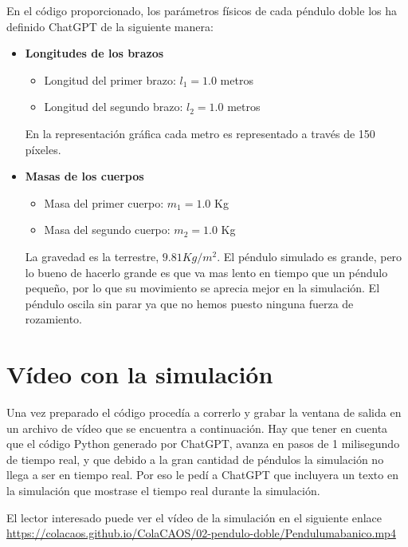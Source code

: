 \documentclass[
  10pt,
  a4paper,
  DIV=11,
  numbers=noendperiod,
  open=any]{scrreprt}
\providecommand{\tightlist}{%
  \setlength{\itemsep}{0pt}\setlength{\parskip}{0pt}}
\numberwithin{equation}{chapter}
\numberwithin{equation}{section}
\renewcommand{\[}{\begin{equation}}
\renewcommand{\]}{\end{equation}}
\begin{document}
En el código proporcionado, los parámetros físicos de cada péndulo doble
los ha definido ChatGPT de la siguiente manera:

\begin{itemize}
\item
  \textbf{Longitudes de los brazos}

  \begin{itemize}
  \tightlist
  \item
    Longitud del primer brazo: \(l_1 = 1.0\) metros\\
  \item
    Longitud del segundo brazo: \(l_2 = 1.0\) metros
  \end{itemize}

  En la representación gráfica cada metro es representado a través de
  150 píxeles.
\item
  \textbf{Masas de los cuerpos}

  \begin{itemize}
  \tightlist
  \item
    Masa del primer cuerpo: \(m_1 = 1.0\) Kg
  \item
    Masa del segundo cuerpo: \(m_2 = 1.0\) Kg
  \end{itemize}

  La gravedad es la terrestre, \(9.81 Kg/m^2\). El péndulo simulado es
  grande, pero lo bueno de hacerlo grande es que va mas lento en tiempo
  que un péndulo pequeño, por lo que su movimiento se aprecia mejor en
  la simulación. El péndulo oscila sin parar ya que no hemos puesto
  ninguna fuerza de rozamiento.
\end{itemize}

\section{Vídeo con la simulación}\label{sec-abanico}

Una vez preparado el código procedía a correrlo y grabar la ventana de
salida en un archivo de vídeo que se encuentra a continuación. Hay que
tener en cuenta que el código Python generado por ChatGPT, avanza en
pasos de 1 milisegundo de tiempo real, y que debido a la gran cantidad
de péndulos la simulación no llega a ser en tiempo real. Por eso le
pedí a ChatGPT que incluyera un texto en la simulación que mostrase el
tiempo real durante la simulación.

El lector interesado puede ver el vídeo de la simulación en el siguiente enlace \url{https://colacaos.github.io/ColaCAOS/02-pendulo-doble/Pendulumabanico.mp4}
\end{document}
